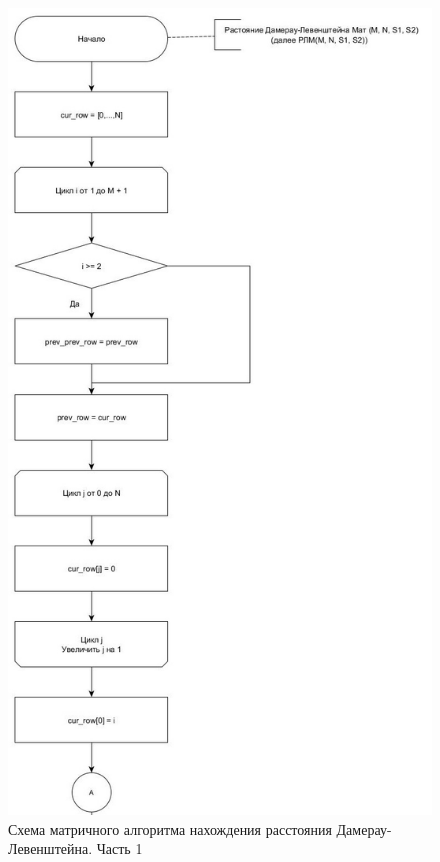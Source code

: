 \documentclass[14pt,russian]{scrartcl}
\begin{document}
\begin{figure}[h]
	\centering
	\includegraphics[width=0.7\linewidth]{damer-lev_matr_11.jpg}
	\caption{Схема матричного алгоритма нахождения расстояния Дамерау-Левенштейна. Часть 1}
	\label{fig:iter_dam_lev1}
\end{figure}
\end{document}
